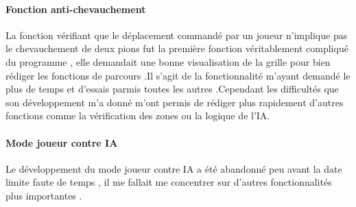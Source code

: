 \documentclass[a4paper,12pt]{article}
\begin{document}
\paragraph{Fonction anti-chevauchement}
La fonction vérifiant que le déplacement commandé par un joueur n'implique pas le chevauchement de deux pions fut la première fonction véritablement compliqué du programme , elle demandait une bonne visualisation de la grille pour bien rédiger les fonctions de parcours .Il s'agit de la fonctionnalité m'ayant demandé le plus de temps et d'essais parmis toutes les autres .Cependant les difficultés que son développement m'a donné m'ont permis de rédiger plus rapidement d'autres fonctions comme la vérification des zones ou la logique de l'IA.
\newline
\newline
\paragraph{Mode joueur contre IA}
Le développement du mode joueur contre IA a été abandonné peu avant la date limite faute de temps , il me fallait me concentrer sur d'autres fonctionnalités plus importantes .
\end{document}
